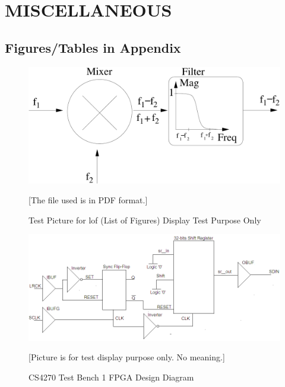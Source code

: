 \chapter{MISCELLANEOUS \label{cha:appendix}}

\TAMUTocAddWordPage

\section{Figures/Tables in Appendix}

\begin{figure}[!htbp]
\begin{center}
\includegraphics[width=\textwidth]{graphic/analogue_mixer.pdf}
\caption{Test Picture for lof (List of Figures) Display Test Purpose Only}
[The file used is in PDF format.]
\label{fig:chirpHardware}
\end{center}
\end{figure}


\begin{figure}[!htbp]
\begin{center}
\includegraphics[width=\textwidth]{graphic/TestPattern1.bmp}
\caption{CS4270 Test Bench 1 FPGA Design Diagram}
\label{fig:cs4270test1}
{\small [Picture is for test display purpose only. No meaning.]}
\end{center}
\end{figure}


